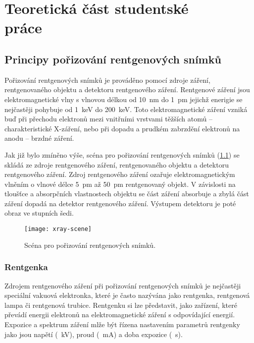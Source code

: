 \chapter[Teoretická část studentské práce]{Teoretická část studentské\\ práce}

\section{Principy pořizování rentgenových snímků}
Pořizování rentgenových snímků je prováděno pomocí zdroje \zk záření, rentgenovaného objektu a detektoru rentgenového záření. Rentgenové záření jsou elektromagnetické vlny s vlnovou délkou od \SI{10}{\nano\meter} do \SI{1}{\pico\meter} jejichž enerigie se nejčastěji pohybuje od \SI{1}{\kilo\eV} do \SI{200}{\kilo\eV}. Toto elektromagnetické záření vzniká buď při přechodu elektronů mezi vnitřními vrstvami těžších atomů -- charakteristické X-záření, nebo při dopadu a prudkém zabrzdění elektronů na anodu -- brzdné záření. \cite{AstroNuklFyzika-JadRadFyzika}

Jak již bylo zmíněno výše, scéna pro pořizování rentgenových snímků (\cref{fig:x-ray-scene}) se skládá ze zdroje rentgenového záření, rentgenovaného objektu a detektoru rentgenového záření. Zdroj rentgenového záření ozařuje elektromagnetickým vlněním o vlnové délce \SI{5}{\pico\meter} až \SI{50}{\pico\meter} rentgenovaný objekt. V závislosti na tloušťce a absorpčních vlastnostech objektu se část záření absorbuje a zbylá část záření dopadá na detektor rentgenového záření. Výstupem detektoru je poté obraz ve stupních šedi. \cite[kap 3.2]{AstroNuklFyzika-JadRadMetody}

\begin{figure}[bh]
\texttt{[image: xray-scene]}
\caption{Scéna pro pořizování rentgenových snímků.}
\label{fig:x-ray-scene}
\centering
\end{figure}

\subsection{Rentgenka}
Zdrojem rentgenového záření při pořizování rentgenových snímků je nejčastěji speciální vakuová elektronka, které je často nazývána jako rentgenka, rentgenová lampa či rentgenová trubice. \cite{AstroNuklFyzika-JadRadMetody} Rentgenku si lze představit, jako zařízení, které převádí energii elektronů na elektromagnetické záření s odpovídající energií. Expozice a spektrum záření mlže být řízena nastavením parametrů rentgenky jako jsou napětí (\SI{}{\kilo\volt}), proud (\SI{}{\milli\ampere}) a doba expozice (\SI{}{\second}). \cite[str.~93]{Diagnostic-Radiology-Physics}

